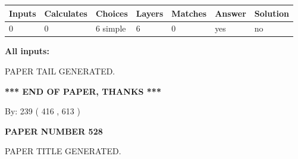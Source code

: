 \documentclass[12pt]{article}
\begin{document}
   
   
   
\noindent\begin{tabular}{|l|l|l|l|l|l|l|}
 \hline
Inputs & Calculates & Choices & Layers & Matches & Answer & Solution \\ \hline
 0  & 
 0  & 
 6
  simple  
  & 
 6  & 
 0  & 
  yes & 
  no 
  \\ \hline
 \end{tabular}
   
   
   
   
\noindent{}
   
   
   
   
\noindent\vspace{0.1in}\hspace{-0.08in} {\textbf{\Large{All inputs: }}}
   
   
   
   
   
   
 \vspace{0.2in}
 
   
   
\vspace{2.0in} PAPER TAIL GENERATED.
   
   
   
   
\vspace{1.0in} 
{\textbf{\large{ *** END OF PAPER, THANKS *** }}} 
   
   
\hspace{1.0in} By: 
 239 ( 416 ,  613 )
   
   
   
   
\newpage 
\setcounter{page}{ 
   528001 } 
   
   
   
   
 {\textbf{ \Large{ PAPER NUMBER  528  }}}
   
   
\vspace{0.2in}
   
   
   
   
   
   
   
   
 \vspace{0.2in}
 
 
 
 
   
   
 PAPER TITLE GENERATED.
   
   
   
\end{document}
